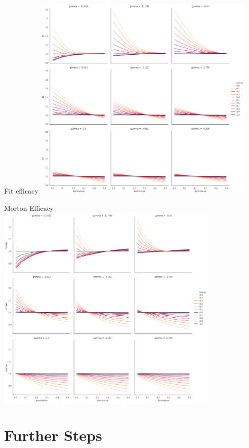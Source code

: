 \documentclass[10pt]{beamer}
\begin{document}
\begin{frame}[t]{Fit efficacy}
  \vfill
  \centering
  \includegraphics[width=0.8\textwidth]{./Figures/fit.png}
\end{frame}


\begin{frame}[t]{Morton Efficacy}
  \vfill
  \centering
  \includegraphics[width=0.8\textwidth]{./Figures/morton.png}
\end{frame}

\section{Further Steps}
\end{document}
